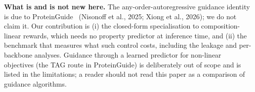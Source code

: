 \textbf{What is and is not new here.} The any-order-autoregressive guidance
identity is due to ProteinGuide~\cite{discrete_guidance,proteinguide} (Nisonoff
et al., 2025; Xiong et al., 2026); we do not claim it. Our contribution is (i)
the closed-form specialisation to composition-linear rewards, which needs no
property predictor at inference time, and (ii) the benchmark that measures what
such control costs, including the leakage and per-backbone analyses. Guidance
through a learned predictor for non-linear objectives (the TAG route in
ProteinGuide) is deliberately out of scope and is listed in the limitations; a
reader should not read this paper as a comparison of guidance algorithms.
